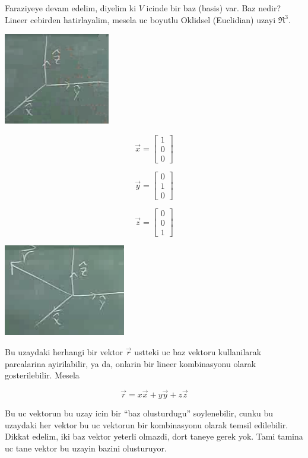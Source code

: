 \documentclass[12pt,fleqn]{article}
\begin{document}
Faraziyeye devam edelim, diyelim ki $V$ icinde bir baz (basis) var. Baz
nedir? Lineer cebirden hatirlayalim, mesela uc boyutlu Oklidsel (Euclidian)
uzayi $\Re^3$. 

\includegraphics[height=4cm]{1_02.png}

\[ 
\vec{x} = 
\left[\begin{array}{r}
1 \\ 0 \\ 0
\end{array}\right]
 \]

\[ 
\vec{y} = 
\left[\begin{array}{r}
0 \\ 1 \\ 0
\end{array}\right]
 \]

\[ 
\vec{z} = 
\left[\begin{array}{r}
0 \\ 0 \\ 1
\end{array}\right]
 \]

\includegraphics[height=4cm]{1_03.png}

Bu uzaydaki herhangi bir vektor $\vec{r}$ ustteki uc baz vektoru
kullanilarak parcalarina ayirilabilir, ya da, onlarin bir lineer
kombinasyonu olarak gosterilebilir. Mesela

\[ \vec{r} = x\vec{x} +  y\vec{y} +  z\vec{z} \]

Bu uc vektorun bu uzay icin bir ``baz olusturdugu'' soylenebilir, cunku bu
uzaydaki her vektor bu uc vektorun bir kombinasyonu olarak temsil
edilebilir. Dikkat edelim, iki baz vektor yeterli olmazdi, dort taneye
gerek yok. Tami tamina uc tane vektor bu uzayin bazini olusturuyor. 
\end{document}
